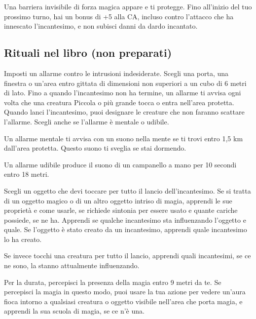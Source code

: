 \documentclass[letterpaper,twocolumn,openany,nodeprecatedcode,justified]{dndbook}
\begin{document}
Una barriera invisibile di forza magica appare e ti protegge. Fino all'inizio del tuo prossimo turno, hai un bonus di +5 alla CA, incluso contro l'attacco che ha innescato l'incantesimo, e non subisci danni da dardo incantato.

\subsection*{Rituali nel libro (non preparati)}


Imposti un allarme contro le intrusioni indesiderate. Scegli una porta, una finestra o un'area entro gittata di dimensioni non superiori a un cubo di 6 metri di lato. Fino a quando l'incantesimo non ha termine, un allarme ti avvisa ogni volta che una creatura Piccola o più grande tocca o entra nell'area protetta. Quando lanci l'incantesimo, puoi designare le creature che non faranno scattare l'allarme. Scegli anche se l'allarme è mentale o udibile.

Un allarme mentale ti avvisa con un suono nella mente se ti trovi entro 1,5 km dall'area protetta. Questo suono ti sveglia se stai dormendo.

Un allarme udibile produce il suono di un campanello a mano per 10 secondi entro 18 metri.


Scegli un oggetto che devi toccare per tutto il lancio dell'incantesimo. Se si tratta di un oggetto magico o di un altro oggetto intriso di magia, apprendi le sue proprietà e come usarle, se richiede sintonia per essere usato e quante cariche possiede, se ne ha. Apprendi se qualche incantesimo sta influenzando l'oggetto e quale. Se l'oggetto è stato creato da un incantesimo, apprendi quale incantesimo lo ha creato.

Se invece tocchi una creatura per tutto il lancio, apprendi quali incantesimi, se ce ne sono, la stanno attualmente influenzando.


Per la durata, percepisci la presenza della magia entro 9 metri da te. Se percepisci la magia in questo modo, puoi usare la tua azione per vedere un'aura fioca intorno a qualsiasi creatura o oggetto visibile nell'area che porta magia, e apprendi la sua scuola di magia, se ce n'è una.
\end{document}

